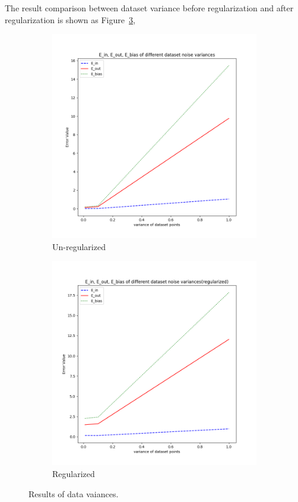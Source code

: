 \documentclass[12pt,letterpaper]{article}
\begin{document}
The result comparison between dataset variance before regularization and after regularization is shown as Figure~\ref{fig:variance_reg},
\begin{figure}[h]
\centering
\begin{subfigure}{.45\textwidth}
  \centering
  \includegraphics[width=.9\linewidth]{test_sigma_noreg.png}
  \caption{\small Un-regularized}
  \label{fig:sub1}
\end{subfigure}
\begin{subfigure}{.45\textwidth}
  \centering
  \includegraphics[width=.9\linewidth]{test_sigma_regularized.png}
  \caption{\small Regularized}
  \label{fig:sub2}
\end{subfigure}
\caption{\small Results of data vaiances.}
\label{fig:variance_reg}
\end{figure}
\end{document}
